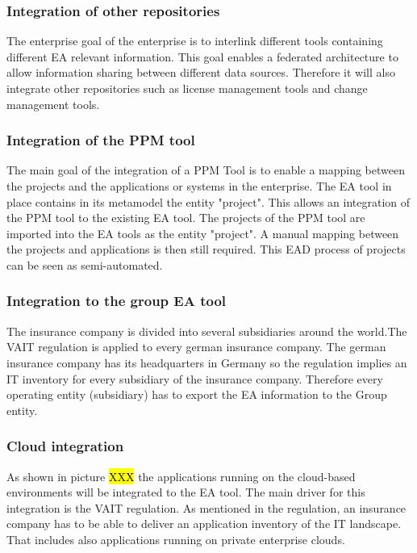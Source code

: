 \subsubsection{Integration of other repositories}
The enterprise goal of the enterprise is to interlink different tools containing different EA relevant information. This goal enables a federated architecture to allow information sharing between different data sources. Therefore it will also integrate other repositories such as license management tools and change management tools.

\subsubsection{Integration of the PPM tool}
The main goal of the integration of a PPM Tool is to enable a mapping between the projects and the applications or systems in the enterprise. The EA tool in place contains in its metamodel the entity "project". This allows an integration of the PPM tool to the existing EA tool. The projects of the PPM tool are imported into the EA tools as the entity "project". A manual mapping between the projects and applications is then still required. This EAD process of projects can be seen as semi-automated.

\subsubsection{Integration to the group EA tool}

The insurance company is divided into several subsidiaries around the world.The VAIT regulation is applied to every german insurance company. The german insurance company has its headquarters in Germany so the regulation implies an IT inventory for every subsidiary of the insurance company. Therefore every operating entity (subsidiary) has to export the EA information to the Group entity.

\subsubsection{Cloud integration}

As shown in picture \hl{XXX} the applications running on the cloud-based environments will be integrated to the EA tool. The main driver for this integration is the VAIT regulation. As mentioned in the regulation, an insurance company has to be able to deliver an application inventory of the IT landscape. That includes also applications running on private enterprise clouds. 

